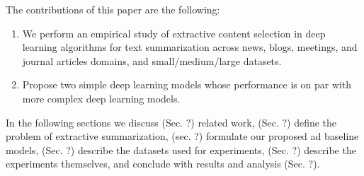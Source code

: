 The contributions of this paper are the following:
\begin{enumerate}
    \item We perform an empirical study of extractive content selection in 
        deep learning 
        algorithms for text summarization across news, blogs, meetings, and
         journal articles domains, and small/medium/large datasets.
    \item Propose two simple deep learning models whose performance is on par 
          with more complex deep learning models.
\end{enumerate}
In the following sections we discuss 
(Sec. ?) related work, 
(Sec. ?) define the problem of extractive summarization, 
(sec. ?) formulate our proposed ad baseline models,
(Sec. ?) describe the datasets used for experiments,
(Sec. ?) describe the experiments themselves, and conclude with 
results and analysis (Sec. ?).


